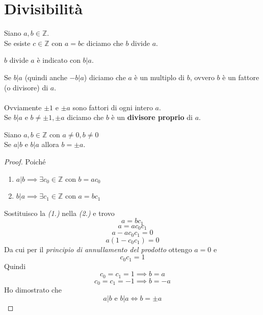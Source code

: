 \documentclass[a4paper,12pt, oneside]{book}
\begin{document}
\section{Divisibilità}
	\begin{definizione}
		Siano $a,b \in \mathbb{Z}$.\\
		Se esiste $c \in \mathbb{Z}$ con $a=bc$ diciamo che $b$ divide $a$.
	\end{definizione}
	\begin{nota}
		$b$ divide $a$ è indicato con $b|a$.
	\end{nota}
	\begin{osservazione}
		Se $b|a$ (quindi anche $-b|a$) diciamo che $a$ è un multiplo di $b$, ovvero $b$ è un fattore (o divisore) di $a$.\\\\
		Ovviamente $\pm1$ e $\pm a$ sono fattori di ogni intero $a$.\\
		Se $b|a$ e $b \not = \pm 1, \pm a$ diciamo che $b$ è un \textbf{divisore proprio} di $a$.
	\end{osservazione}
	\begin{osservazione}
		Siano $a,b \in \mathbb{Z}$ con $a \not = 0, b \not = 0$\\
		Se 	$a|b$ e $b|a$ allora $b=\pm a$.
		\begin{proof}
			Poiché\\
			\begin{enumerate}
				\item $a|b \implies \exists c_0 \in \mathbb{Z}$ con $b=a c_0$
				\item $b|a \implies \exists c_1 \in \mathbb{Z}$ con $a=b c_1$
			\end{enumerate}	
			Sostituisco la \textit{(1.)} nella \textit{(2.)} e trovo
			$$a = b c_1$$
			$$a = a c_0 c_1$$
			$$a - a c_0 c_1 = 0$$
			$$a(1- c_0 c_1) = 0$$
			Da cui per il \textit{principio di annullamento del prodotto} ottengo $a = 0$ e
			$$c_0 c_1 = 1$$
			Quindi
			$$c_0 = c_1 = 1 \implies b = a$$
			$$c_0 = c_1 = -1 \implies b = -a$$
			Ho dimostrato che
			$$a|b \mbox{ e } b|a \iff b=\pm a$$
		\end{proof}
	\end{osservazione}
\end{document}
